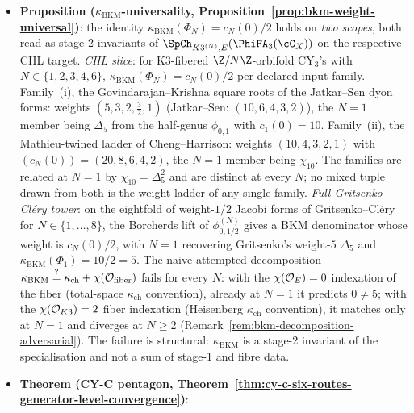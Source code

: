 \begin{itemize}[leftmargin=1.5em,topsep=0.3ex,itemsep=0.5ex]
{ Theorem~\ref{thm:borcherds-lift-universal})}: for a
 lattice $\Lambda$ of signature $(2, n+2)$ and a weakly
 holomorphic modular form $F$ of weight $(2-n)/2$ with
 integral Fourier coefficients $c(m)$, the singular theta
 lift $\Psi(F)$ is an $\Aut(\Lambda)$-invariant meromorphic
 modular form on the Grassmannian with product expansion,
 weight $c(0)/2$, and Hecke-intertwining functoriality.
 \item \textbf{Proposition
 ($\kappa_{\mathrm{BKM}}$-universality,
 Proposition~\ref{prop:bkm-weight-universal})}: the identity
 $\kappa_{\mathrm{BKM}}(\Phi_N) = c_N(0)/2$ holds on
 \emph{two scopes}, both read as stage-2 invariants of
 $\SpCh_{K3^{(N)}, E}(\PhiFA_3(\cC_X))$ on the respective
 CHL target.
 \emph{CHL slice}: for K3-fibered
 $\Z/N\Z$-orbifold CY$_3$'s with $N \in \{1, 2, 3, 4, 6\}$,
 $\kappa_{\mathrm{BKM}}(\Phi_N) = c_N(0)/2$ per declared input
 family. Family~(i), the Govindarajan--Krishna square roots of the
 Jatkar--Sen dyon forms: weights $(5, 3, 2, \tfrac32, 1)$
 (Jatkar--Sen: $(10, 6, 4, 3, 2)$), the $N = 1$ member being
 $\Delta_5$ from the half-genus $\phi_{0,1}$ with $c_1(0) = 10$.
 Family~(ii), the Mathieu-twined ladder of Cheng--Harrison: weights
 $(10, 4, 3, 2, 1)$ with $(c_N(0)) = (20, 8, 6, 4, 2)$, the $N = 1$
 member being $\chi_{10}$. The families are related at $N = 1$ by
 $\chi_{10} = \Delta_5^2$ and are distinct at every $N$; no mixed
 tuple drawn from both is the weight ladder of any single family.
 \emph{Full Gritsenko--Cl\'ery tower}: on the eightfold of
 weight-$1/2$ Jacobi forms of Gritsenko--Cl\'ery for
 $N \in \{1, \ldots, 8\}$, the Borcherds lift of
 $\phi^{(N)}_{0, 1/2}$ gives a BKM denominator whose weight
 is $c_N(0)/2$, with $N = 1$ recovering Gritsenko's
 weight-$5$ $\Delta_5$
 and $\kappa_{\mathrm{BKM}}(\Phi_1) = 10/2 = 5$.
 The naive attempted decomposition
 $\kappa_{\mathrm{BKM}} \stackrel{?}{=} \kappa_{\mathrm{ch}} +
 \chi(\mathcal{O}_{\mathrm{fiber}})$ fails for every $N$: with the
 $\chi(\mathcal{O}_E) = 0$ indexation of the fiber (total-space $\kappa_{\mathrm{ch}}$
 convention), already at $N = 1$ it predicts $0 \neq 5$; with
 the $\chi(\mathcal{O}_{K3}) = 2$ fiber indexation (Heisenberg $\kappa_{\mathrm{ch}}$
 convention), it matches only at $N = 1$ and diverges at
 $N \geq 2$
 (Remark~\ref{rem:bkm-decomposition-adversarial}). The
 failure is structural: $\kappa_{\mathrm{BKM}}$ is a stage-2
 invariant of the specialisation and not a sum of stage-1
 and fibre data.
 \item \textbf{Theorem (CY-C pentagon,
 Theorem~\ref{thm:cy-c-six-routes-generator-level-convergence})}:

\end{itemize}
